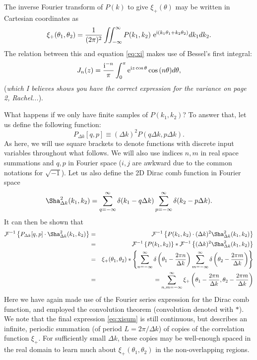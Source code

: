 \documentclass[preprint]{aastex}
\newcommand{\mi}{{\rm i}}
\newcommand{\me}{{\rm e}}
\begin{document}
The inverse Fourier transform of $P(k)$ to give $\xi_+(\theta)$ may 
be written in Cartesian coordinates as
\begin{equation}
\xi_{+}(\theta_1, \theta_2)  = \frac{1}{(2 \pi)^2} \int \! \! \!
\int_{-\infty}^{\infty} P(k_1, k_2) ~ \me^{\mi (k_1 \theta_1 + k_2
  \theta_2)} dk_1 dk_2. \label{eq:xip}
\end{equation}
The relation between this and equation \eqref{eq:xi} makes use of Bessel's first
integral:
\begin{equation}
J_n(z) = \frac{\mi^{-n}}{\pi} \int_0^{\pi} \me^{\mi z \cos{\theta}}
\cos{(n \theta)} d \theta,  
\end{equation}
(\emph{which I believes shows you have the correct expression for the
  variance on page 2, Rachel...}).

What happens if we only have finite samples of $P(k_1, k_2)$?  To
answer that, let us define the following function:
\begin{equation}
P_{\Delta k} [q, p] \equiv (\Delta k)^2 P(q \Delta k, p \Delta k).
\end{equation}
As here, we will use square brackets to denote functions with discrete input
variables throughout what follows.  We will also use indices $n, m$ in
real space summations and $q, p$ in Fourier space ($i,j$ are awkward
due to the common notations for $\sqrt{-1}$).  Let us also define the 2D Dirac
comb function in Fourier space
\begin{equation}
\Sha^2_{\Delta k} (k_1, k_2) = \sum_{q = -\infty}^{\infty} \delta(k_1
- q \Delta k) \sum_{p = -\infty}^{\infty} \delta(k_2
- p \Delta k).
\end{equation}
It can then be shown that
\begin{eqnarray}
\mathcal{F}^{-1} \left\{ P_{\Delta k} [q, p] \cdot  \Sha^2_{\Delta k} (k_1,
  k_2) \right\} & = & \mathcal{F}^{-1} \left\{ P(k_1, k_2) \cdot  (\Delta
  k)^2 \Sha^2_{\Delta k} (k_1,
  k_2) \right\}  \nonumber  \\
 & = & \mathcal{F}^{-1} \left\{ P(k_1, k_2) \right\} * \mathcal{F}^{-1} \left\{  (\Delta
  k)^2 \Sha^2_{\Delta k} (k_1, k_2) \right\} \nonumber \\
 & = & \xi_+(\theta_1, \theta_2 )  * \left\{ \sum_{n = -\infty}^{\infty} \delta\left(\theta_1
- \frac{2 \pi n}{\Delta k} \right) \sum_{m = -\infty}^{\infty}
\delta\left( \theta_2
- \frac{2 \pi m}{\Delta k} \right)  \right\} \nonumber \\
& = & = \sum_{n,m=-\infty}^{\infty} \xi_+\left(\theta_1
- \frac{2 \pi n}{\Delta k},  \theta_2
- \frac{2 \pi m}{\Delta k} \right) \label{eq:xisum}
\end{eqnarray}
Here we have again made use of the Fourier series expression for the
Dirac comb function, and employed the convolution theorem (convolution
denoted with $*$).  We note that the final expression \eqref{eq:xisum}
is still continuous, but describes an infinite, periodic summation (of period $L = 2 \pi
/ \Delta k$) of copies of the correlation function $\xi_+$.  For sufficiently small
$\Delta k$, these copies may be well-enough spaced in the real domain to
learn much about $\xi_+(\theta_1, \theta_2)$ in the non-overlapping
regions.
\end{document}
